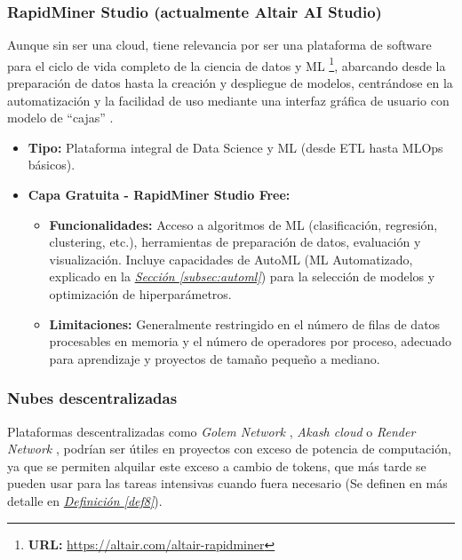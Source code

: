 \subsubsection*{RapidMiner Studio (actualmente Altair AI Studio)}
Aunque sin ser una cloud, tiene relevancia por ser una plataforma de software para el ciclo de vida completo de la ciencia de datos y ML \footnote{ \textbf{URL:} \url{https://altair.com/altair-rapidminer}}, abarcando desde la preparación de datos hasta la creación y despliegue de modelos, centrándose en la automatización y la facilidad de uso mediante una interfaz gráfica de usuario con modelo de ``cajas'' \citep{RapidMinerCourse}. 
\begin{itemize}
	\item \textbf{Tipo:} Plataforma integral de Data Science y ML (desde ETL hasta MLOps básicos).
	\item \textbf{Capa Gratuita - RapidMiner Studio Free:} 
	\begin{itemize}
		\item \textbf{Funcionalidades:} Acceso a algoritmos de ML (clasificación, regresión, clustering, etc.), herramientas de preparación de datos, evaluación y visualización. Incluye capacidades de AutoML (ML Automatizado, explicado en la \hyperref[subsec:automl]{\textit{Sección \ref*{subsec:automl}}}) para la selección de modelos y optimización de hiperparámetros.
		\item \textbf{Limitaciones:} Generalmente restringido en el número de filas de datos procesables en memoria y el número de operadores por proceso, adecuado para aprendizaje y proyectos de tamaño pequeño a mediano.
	\end{itemize}
\end{itemize}


\subsubsection*{Nubes descentralizadas}
Plataformas descentralizadas como \textit{Golem Network} \citep{GolemNetwork}, \textit{Akash cloud} \citep{akashCloud} o \textit{Render Network} \citep{rendernetwork}, podrían ser útiles en proyectos con exceso de potencia de computación, ya que se permiten alquilar este exceso a cambio de tokens, que más tarde se pueden usar para las tareas intensivas cuando fuera necesario (Se definen en más detalle en \hyperref[def8]{\textit{Definición \ref*{def8}}}).


